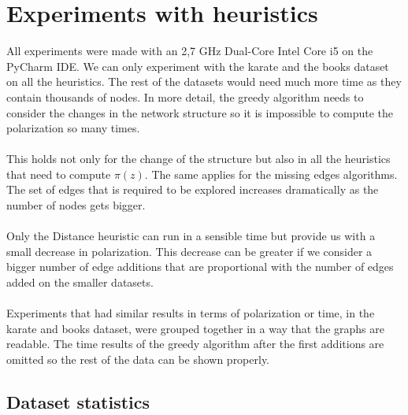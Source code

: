 \section{Experiments with heuristics}
\label{sec:experimHeuristics}

All experiments were made with an 2,7 GHz Dual-Core Intel Core i5 on the PyCharm IDE. We can only experiment with the karate and the books dataset on all the heuristics. The rest of the datasets would need much more time as they contain thousands of nodes. In more detail, the greedy algorithm needs to consider the changes in the network structure so it is impossible to compute the polarization so many times.
\\
\\ 
This holds not only for the change of the structure but also in all the heuristics that need to compute $\pi(z)$. The same applies for the missing edges algorithms. The set of edges that is required to be explored increases dramatically as the number of nodes gets bigger. 
\\
\\
Only the Distance heuristic can run in a sensible time but provide us with a small decrease in polarization. This decrease can be greater if we consider a bigger number of edge additions that are proportional with the number of edges added on the smaller datasets. 
\\
\\
Experiments that had similar results in terms of polarization or time, in the karate and books dataset, were grouped together in a way that the graphs are readable. The time results of the greedy algorithm after the first additions are omitted so the rest of the data can be shown properly.

\subsection{Dataset statistics}

